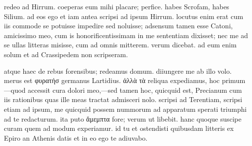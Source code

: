  redeo ad Hirrum. coeperas eum mihi placare; perfice. habes Scrofam, habes Silium. ad eos ego et iam antea scripsi ad ipsum Hirrum. locutus enim erat cum iis commode se potuisse impedire sed noluisse; adsensum tamen esse Catoni, amicissimo meo, cum is honorificentissimam in me sententiam dixisset; nec me ad se ullas litteras misisse, cum ad omnis mitterem. verum dicebat. ad eum enim solum et ad Crassipedem non scripseram.

 atque haec de rebus forensibus; redeamus domum. diiungere me ab illo volo. merus est φυρατήσ germanus Lartidius. ἀλλὰ τὰ reliqua expediamus, hoc primum—quod accessit cura dolori meo,—sed tamen hoc, quicquid est, Precianum cum iis rationibus quas ille meas tractat admisceri nolo. scripsi ad Terentiam, scripsi etiam ad ipsum, me quicquid possem nummorum ad apparatum sperati triumphi ad te redacturum. ita puto ἄμεμπτα fore; verum ut libebit. hanc quoque suscipe curam quem ad modum experiamur. id tu et ostendisti quibusdam litteris ex Epiro an Athenis datis et in eo ego te adiuvabo.
